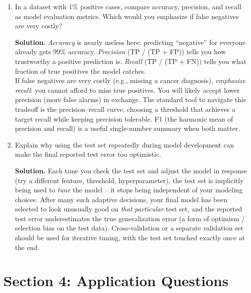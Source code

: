 \documentclass[11pt]{article}
\newcommand{\solution}[1]{%
  \par\medskip\noindent\textbf{Solution.} #1\par\medskip
}
\begin{document}
\begin{enumerate}[leftmargin=*]
\item In a dataset with 1\% positive cases, compare accuracy, precision, and recall as model evaluation metrics. Which would you emphasize if false negatives are very costly?

\solution{\emph{Accuracy} is nearly useless here: predicting ``negative'' for everyone already gets 99\% accuracy. \emph{Precision} (TP / (TP + FP)) tells you how trustworthy a positive prediction is. \emph{Recall} (TP / (TP + FN)) tells you what fraction of true positives the model catches.\\
If false negatives are very costly (e.g., missing a cancer diagnosis), \emph{emphasize recall}: you cannot afford to miss true positives. You will likely accept lower precision (more false alarms) in exchange. The standard tool to navigate this tradeoff is the precision--recall curve, choosing a threshold that achieves a target recall while keeping precision tolerable. F1 (the harmonic mean of precision and recall) is a useful single-number summary when both matter.}

\item Explain why using the test set repeatedly during model development can make the final reported test error too optimistic.

\solution{Each time you check the test set and adjust the model in response (try a different feature, threshold, hyperparameter), the test set is implicitly being used to \emph{tune} the model -- it stops being independent of your modeling choices. After many such adaptive decisions, your final model has been selected to look unusually good on \emph{that particular} test set, and the reported test error underestimates the true generalization error (a form of optimism / selection bias on the test data). Cross-validation or a separate validation set should be used for iterative tuning, with the test set touched exactly once at the end.}

\end{enumerate}


\newpage
\section*{Section 4: Application Questions}
\end{document}

